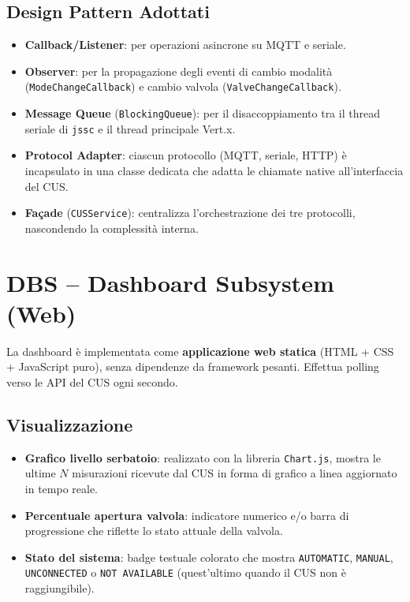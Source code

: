 \documentclass[12pt, a4paper]{article}
\begin{document}
\subsection{Design Pattern Adottati}

\begin{itemize}
    \item \textbf{Callback/Listener}: per operazioni asincrone su MQTT e seriale.
    \item \textbf{Observer}: per la propagazione degli eventi di cambio modalità (\texttt{ModeChangeCallback}) e cambio valvola (\texttt{ValveChangeCallback}).
    \item \textbf{Message Queue} (\texttt{BlockingQueue}): per il disaccoppiamento tra il thread seriale di \texttt{jssc} e il thread principale Vert.x.
    \item \textbf{Protocol Adapter}: ciascun protocollo (MQTT, seriale, HTTP) è incapsulato in una classe dedicata che adatta le chiamate native all'interfaccia del CUS.
    \item \textbf{Façade} (\texttt{CUSService}): centralizza l'orchestrazione dei tre protocolli, nascondendo la complessità interna.
\end{itemize}

\section{DBS -- Dashboard Subsystem (Web)}

La dashboard è implementata come \textbf{applicazione web statica} (HTML + CSS + JavaScript puro), senza dipendenze da framework pesanti. Effettua polling verso le API del CUS ogni secondo.

\subsection{Visualizzazione}

\begin{itemize}
    \item \textbf{Grafico livello serbatoio}: realizzato con la libreria \texttt{Chart.js}, mostra le ultime $N$ misurazioni ricevute dal CUS in forma di grafico a linea aggiornato in tempo reale.
    \item \textbf{Percentuale apertura valvola}: indicatore numerico e/o barra di progressione che riflette lo stato attuale della valvola.
    \item \textbf{Stato del sistema}: badge testuale colorato che mostra \texttt{AUTOMATIC}, \texttt{MANUAL}, \texttt{UNCONNECTED} o \texttt{NOT AVAILABLE} (quest'ultimo quando il CUS non è raggiungibile).
\end{itemize}
\end{document}
